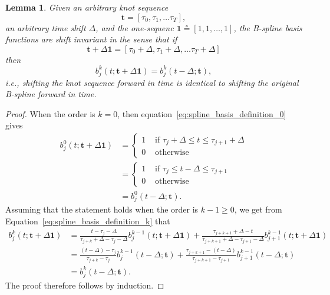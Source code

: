 \documentclass{article}
\newtheorem{lemma}[theorem]{Lemma}
\newcommand{\defeq}{\circeq}
\begin{document}
\begin{lemma} \label{lem:basis_are_shift_invariant}
Given an arbitrary knot sequence
\[
\mathbf{t} = [\tau_0, \tau_1, \dots \tau_T],
\]
an arbitrary time shift $\Delta$, and the one-sequenc $\mathbf{1}\defeq[1, 1, \dots, 1]$, the B-spline basis functions are shift invariant in the sense that
if 
\[
\mathbf{t} + \Delta\mathbf{1} = [\tau_0+\Delta, \tau_1+\Delta, \dots \tau_T+\Delta]
\]
then
\[
b_j^k(t; \mathbf{t}+\Delta\mathbf{1}) = b_j^k(t-\Delta; \mathbf{t}),
\]
i.e., shifting the knot sequence forward in time is identical to shifting the original B-spline forward in time.
\end{lemma}
\begin{proof}
When the order is $k=0$, then equation~\eqref{eq:spline_basis_definition_0} gives
\begin{align*}
	b_j^0(t; \mathbf{t}+\Delta\mathbf{1}) &= \begin{cases} 1 & \text{~if~} \tau_j+\Delta \leq t \leq \tau_{j+1}+\Delta \\ 
 									 				   0 & \text{~otherwise} 
 					   					 \end{cases} \\
 					   				   &= \begin{cases} 1 & \text{~if~} \tau_j \leq t-\Delta \leq \tau_{j+1} \\ 
 									 				   0 & \text{~otherwise} 
 					   					 \end{cases} \\ 	
 					   				   &= b_j^0(t-\Delta; \mathbf{t}).
\end{align*}
Assuming that the statement holds when the order is $k-1\geq 0$, we get from 
Equation~\eqref{eq:spline_basis_definition_k} that
\begin{align*}
b_j^k(t; \mathbf{t}+\Delta\mathbf{1}) &= \frac{t-\tau_j-\Delta}{\tau_{j+k}+\Delta-
\tau_j-\Delta} b_j^{k-1}(t; \mathbf{t}+\Delta\mathbf{1}) + \frac{\tau_{j+k+1}+\Delta-t}{\tau_{j+k+1}+\Delta-\tau_{j+1}-\Delta} b_{j+1}^{k-1}(t; \mathbf{t}+\Delta\mathbf{1}) \\
&= \frac{(t-\Delta)-\tau_j}{\tau_{j+k}-
\tau_j} b_j^{k-1}(t-\Delta; \mathbf{t}) + \frac{\tau_{j+k+1}-(t-\Delta)}{\tau_{j+k+1}-\tau_{j+1}} b_{j+1}^{k-1}(t-\Delta; \mathbf{t}) \\
&= b_j^k(t-\Delta; \mathbf{t}).
\end{align*}
The proof therefore follows by induction.
\end{proof}
\end{document}
